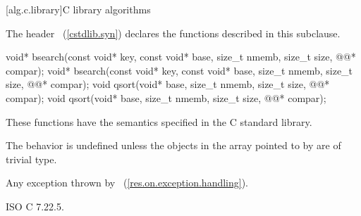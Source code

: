 [alg.c.library]{C library algorithms}

\pnum
{}%
%
\begin{note}
The header ~(\ref{cstdlib.syn})
declares the functions described in this subclause.
\end{note}

%
%
\begin{itemdecl}
void* bsearch(const void* key, const void* base, size_t nmemb, size_t size,
              @@* compar);
void* bsearch(const void* key, const void* base, size_t nmemb, size_t size,
              @@* compar);
void qsort(void* base, size_t nmemb, size_t size, @@* compar);
void qsort(void* base, size_t nmemb, size_t size, @@* compar);
\end{itemdecl}

\begin{itemdescr}
\pnum
\effects
These functions have the semantics specified in the C standard library.

\pnum
\remarks
The behavior is undefined
unless the objects in the array pointed to by 
are of trivial type.

\pnum
\throws
Any exception thrown by ~(\ref{res.on.exception.handling}).
\end{itemdescr}

\xref
ISO C 7.22.5.
